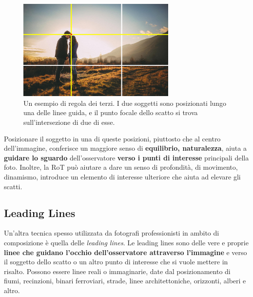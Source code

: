 \begin{figure}[ht]
    \centering
    \includegraphics[width=0.7\textwidth]{Immagini/Introduzione/rot.png}
    \caption{Un esempio di regola dei terzi. I due soggetti sono posizionati lungo una delle linee guida, e il punto focale dello scatto si trova sull'intersezione di due di esse.}
    \label{fig:rule_of_thirds}
\end{figure}

Posizionare il soggetto in una di queste posizioni, piuttosto che al centro dell'immagine, conferisce un maggiore senso di \textbf{equilibrio, naturalezza}, aiuta a \textbf{guidare lo sguardo} dell'osservatore \textbf{verso i punti di interesse} principali della foto. Inoltre, la RoT può aiutare a dare un senso di profondità, di movimento, dinamismo, introduce un elemento di interesse ulteriore che aiuta ad elevare gli scatti.

\subsection{Leading Lines}
\label{leadinglines}
Un'altra tecnica spesso utilizzata da fotografi professionisti in ambito di composizione è quella delle \textit{leading lines}. Le leading lines sono delle vere e proprie \textbf{linee che guidano l'occhio dell'osservatore attraverso l'immagine} e verso il soggetto dello scatto o un altro punto di interesse che si vuole mettere in risalto. Possono essere linee reali o immaginarie, date dal posizionamento di fiumi, recinzioni, binari ferroviari, strade, linee architettoniche, orizzonti, alberi e altro.

